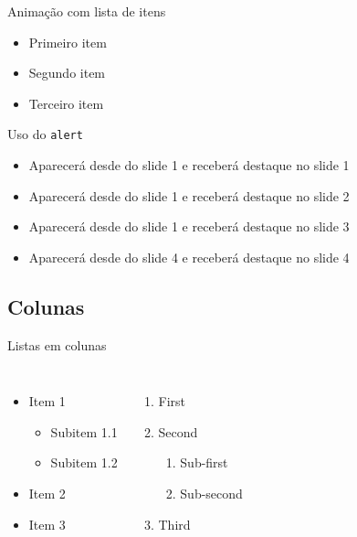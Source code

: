 \documentclass[aspectratio=169]{beamer}
\begin{document}
\begin{frame}{Animação com lista de itens}
\begin{itemize}[<+->]
    \item Primeiro item
    \item Segundo item
    \item Terceiro item
\end{itemize}
\end{frame}

\begin{frame}{Uso do \texttt{alert}}
    \begin{itemize}
        \item<1-| alert@1> Aparecerá desde do slide 1 e receberá destaque no slide 1
        \item<1-| alert@2> Aparecerá desde do slide 1 e receberá destaque no slide 2
        \item<1-| alert@3> Aparecerá desde do slide 1 e receberá destaque no slide 3
        \item<4-| alert@4> Aparecerá desde do slide 4 e receberá destaque no slide 4
    \end{itemize} 
\end{frame}

\subsection{Colunas}

\begin{frame}{Listas em colunas}
    \begin{columns}[t, onlytextwidth]
            \begin{itemize}
                \item Item 1
                \begin{itemize}
                    \item Subitem 1.1
                    \item Subitem 1.2
                \end{itemize}
                \item Item 2
                \item Item 3
            \end{itemize}
        
            \begin{enumerate}
                \item First
                \item Second
                \begin{enumerate}
                    \item Sub-first
                    \item Sub-second
                \end{enumerate}
                \item Third
            \end{enumerate}
    \end{columns}
\end{frame}
\end{document}
